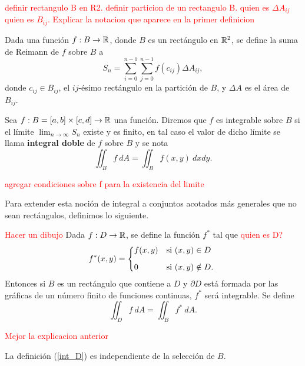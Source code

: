 \textcolor{red}{definir rectangulo B en R2. }
\textcolor{red}{definir particion de un rectangulo B. quien es $\Delta A_{ij}$  quien es $B_{ij}$. Explicar la notacion que aparece en la primer definicion }



\begin{definition}
Dada una funci\'on $f:B\to\mathbb{R}$, donde $B$ es un rect\'angulo en $\mathbb{R}^2$, se define la suma de Reimann de $f$ sobre $B$ a 
\[
    S_n=\sum_{i=0}^{n-1}\sum_{j=0}^{n-1} f(c_{ij})\Delta A_{ij},
\]  
donde $c_{ij}\in B_{ij}$, el $ij$-\'esimo rect\'angulo en la partici\'on de $B$, y $\Delta A$ es el \'area de $B_{ij}$.
\end{definition}



\begin{definition} 
    Sea $f:B=[a,b]\times[c,d]\to\mathbb{R}$ una funci\'on. Diremos que $f$ es integrable sobre $B$ si  el l\'imite $\lim_{n\to\infty}S_n$  existe y es finito, en tal caso el valor de dicho  l\'imite  se llama \textbf{integral doble} de $f$ sobre $B$ y se nota 
    \[
          \iint_B f\:dA=\iint_B f(x,y)\:dxdy.
    \]
\end{definition}

\begin{obs}
\textcolor{red}{agregar condiciones sobre f para la  existencia del limite}
\end{obs}


Para extender esta noci\'on de integral a  conjuntos acotados m\'as generales que no sean  rect\'angulos, definimos lo siguiente. 

\begin{definition}\label{int_D} \textcolor{red}{Hacer un dibujo}
Dada $f:D\to\mathbb{R}$, se define la funci\'on $f^*$ tal que \textcolor{red}{quien es D?}
\[
    f^*(x,y)=
    \begin{dcases*}
        f(x,y) & si $(x,y)\in D$ \\[.2cm]
        0        & si $(x,y)\notin D.$
    \end{dcases*}
\]
Entonces si $B$ es un rect\'angulo que contiene a $D$ y $\partial D$ est\'a formada por las gr\'aficas de un n\'umero finito de funciones continuas,  $f^*$ ser\'a integrable.  Se define
\[
    \iint_D f\:dA=\iint_B f^*\:dA.  
\]
\end{definition}

\textcolor{red}{Mejor la explicacion anterior}

\begin{obs} 
La  definici\'on  (\ref{int_D})  es independiente  de la selecci\'on de $B$.
\end{obs}

